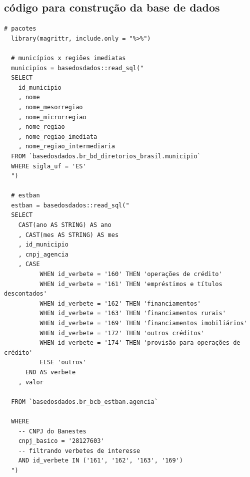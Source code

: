 \postextual

%
%
%
%
%

\begin{anexosenv}
\partanexos

\chapter{código para construção da base de dados}\label{anexo_a}

\begin{lstlisting}[frame=single]
  # pacotes
  library(magrittr, include.only = "%>%")
  
  # municípios x regiões imediatas
  municipios = basedosdados::read_sql("
  SELECT
    id_municipio
    , nome
    , nome_mesorregiao
    , nome_microrregiao
    , nome_regiao
    , nome_regiao_imediata
    , nome_regiao_intermediaria
  FROM `basedosdados.br_bd_diretorios_brasil.municipio`
  WHERE sigla_uf = 'ES'
  ")
  
  # estban
  estban = basedosdados::read_sql("
  SELECT
    CAST(ano AS STRING) AS ano
    , CAST(mes AS STRING) AS mes
    , id_municipio
    , cnpj_agencia
    , CASE
          WHEN id_verbete = '160' THEN 'operações de crédito'
          WHEN id_verbete = '161' THEN 'empréstimos e títulos descontados'
          WHEN id_verbete = '162' THEN 'financiamentos'
          WHEN id_verbete = '163' THEN 'financiamentos rurais'
          WHEN id_verbete = '169' THEN 'financiamentos imobiliários'
          WHEN id_verbete = '172' THEN 'outros créditos'
          WHEN id_verbete = '174' THEN 'provisão para operações de crédito'
          ELSE 'outros'
      END AS verbete
    , valor
  
  FROM `basedosdados.br_bcb_estban.agencia`
  
  WHERE
    -- CNPJ do Banestes
    cnpj_basico = '28127603'
    -- filtrando verbetes de interesse
    AND id_verbete IN ('161', '162', '163', '169')
  ")
  

\end{lstlisting}
\end{anexosenv}
